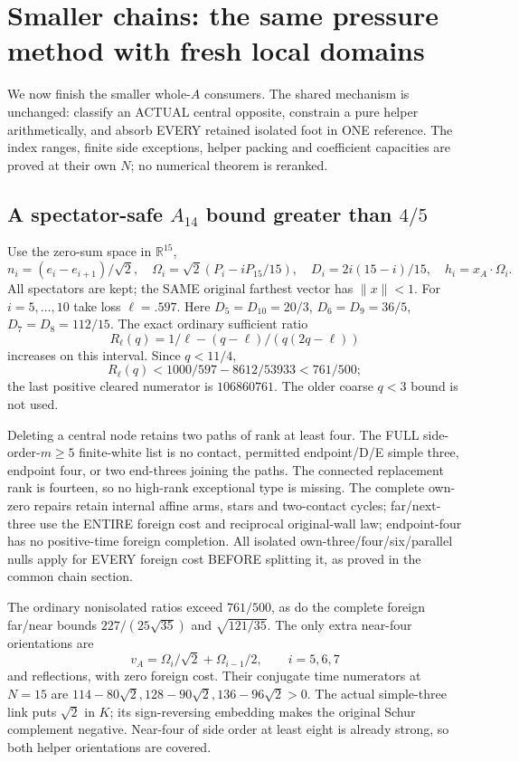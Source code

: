 \section{Smaller chains: the same pressure method with fresh local domains}
\label{app:arithsmallerchains}

We now finish the smaller whole-\(A\) consumers.
The shared mechanism is unchanged: classify an
ACTUAL central opposite, constrain a pure helper
arithmetically, and absorb EVERY retained isolated
foot in ONE reference.
The index ranges, finite side exceptions, helper
packing and coefficient capacities are proved at
their own \(N\); no numerical theorem is reranked.

\subsection{A spectator-safe \(A_{14}\) bound greater than \(4/5\)}
\label{app:arithA14fourfifths}

Use the zero-sum space in \(\mathbb R^{15}\),
\[
 n_i=(e_i-e_{i+1})/\sqrt2,\quad
 \Omega_i=\sqrt2(P_i-iP_{15}/15),\quad
 D_i=2i(15-i)/15,\quad h_i=x_A\cdot\Omega_i .
\]
All spectators are kept; the SAME original
farthest vector has \(\|x\|<1\).
For \(i=5,\ldots,10\) take loss
\(\ell=.597\).
Here \(D_5=D_{10}=20/3\),
\(D_6=D_9=36/5\), \(D_7=D_8=112/15\).
The exact ordinary sufficient ratio
\[
 R_\ell(q)=1/\ell-(q-\ell)/(q(2q-\ell))
\]
increases on this interval.
Since \(q<11/4\),
\[
 R_\ell(q)<1000/597-8612/53933<761/500 ;
\]
the last positive cleared numerator is \(106860761\).
The older coarse \(q<3\) bound is not used.

Deleting a central node retains two paths
of rank at least four.
The FULL side-order-\(m\ge5\) finite-white
list is no contact, permitted endpoint/D/E
simple three, endpoint four, or two end-threes
joining the paths.
The connected replacement rank is fourteen,
so no high-rank exceptional type is missing.
The complete own-zero repairs retain internal
affine arms, stars and two-contact cycles;
far/next-three use the ENTIRE foreign cost
and reciprocal original-wall law;
endpoint-four has no positive-time foreign
completion.
All isolated own-three/four/six/parallel nulls
apply for EVERY foreign cost BEFORE splitting it,
as proved in the common chain section.

The ordinary nonisolated ratios exceed \(761/500\),
as do the complete foreign far/near bounds
\(227/(25\sqrt{35})\) and \(\sqrt{121/35}\).
The only extra near-four orientations are
\[
                   v_A=\Omega_i/\sqrt2+\Omega_{i-1}/2,
                         \qquad i=5,6,7
\]
and reflections, with zero foreign cost.
Their conjugate time numerators at \(N=15\)
are
\(114-80\sqrt2,128-90\sqrt2,136-96\sqrt2>0\).
The actual simple-three link puts \(\sqrt2\)
in \(K\); its sign-reversing embedding makes
the original Schur complement negative.
Near-four of side order at least eight is
already strong, so both helper orientations
are covered.

